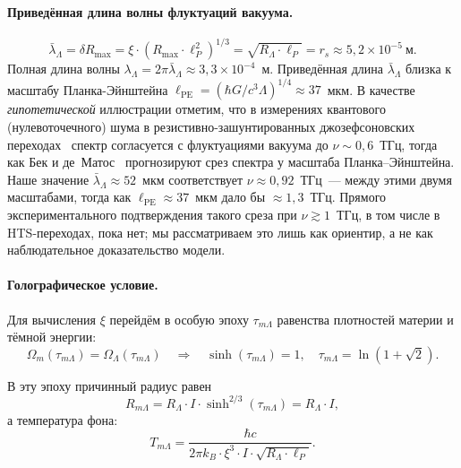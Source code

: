 \documentclass[12pt,a4paper]{article}
\begin{document}
\paragraph{Приведённая длина волны флуктуаций вакуума.}
\begin{equation}
\bar\lambda_\Lambda = \delta R_{\max} = \xi \cdot (R_{\max} \cdot \ell_P^2)^{1/3} = \sqrt{R_\Lambda \cdot \ell_P} = r_s \approx 5{,}2 \times 10^{-5}~\text{м}.
\end{equation}
Полная длина волны $\lambda_\Lambda = 2\pi\bar\lambda_\Lambda \approx 3{,}3 \times 10^{-4}$~м. Приведённая длина $\bar\lambda_\Lambda$ близка к масштабу Планка-Эйнштейна $\ell_{\mathrm{PE}} = (\hbar G / c^3 \Lambda)^{1/4} \approx 37$~мкм.
В качестве \emph{гипотетической} иллюстрации отметим, что в измерениях квантового (нулевоточечного) шума в резистивно-зашунтированных джозефсоновских переходах~\cite{Koch1982} спектр согласуется с флуктуациями вакуума до $\nu\sim0{,}6$~ТГц, тогда как Бек и де~Матос~\cite{Beck2007} прогнозируют срез спектра у масштаба Планка--Эйнштейна. Наше значение $\bar\lambda_\Lambda \approx 52$~мкм соответствует $\nu \approx 0{,}92$~ТГц~--- между этими двумя масштабами, тогда как $\ell_{\mathrm{PE}} \approx 37$~мкм дало бы $\approx 1{,}3$~ТГц. Прямого экспериментального подтверждения такого среза при $\nu\gtrsim1$~ТГц, в том числе в HTS-переходах, пока нет; мы рассматриваем это лишь как ориентир, а не как наблюдательное доказательство модели.

\paragraph{Голографическое условие.}
Для вычисления $\xi$ перейдём в особую эпоху $\tau_{m\Lambda}$ равенства плотностей материи и тёмной энергии:
\begin{equation}
\Omega_m(\tau_{m\Lambda}) = \Omega_\Lambda(\tau_{m\Lambda}) \quad\Longrightarrow\quad \sinh(\tau_{m\Lambda}) = 1, \quad \tau_{m\Lambda} = \ln(1 + \sqrt{2}).
\end{equation}

В эту эпоху причинный радиус равен
\begin{equation}
R_{m\Lambda} = R_\Lambda \cdot I \cdot \sinh^{2/3}(\tau_{m\Lambda}) = R_\Lambda \cdot I,
\end{equation}
а температура фона:
\begin{equation}
T_{m\Lambda} = \frac{\hbar c}{2\pi k_B \cdot \xi^3 \cdot I \cdot \sqrt{R_\Lambda \cdot \ell_P}}.
\end{equation}
\end{document}
